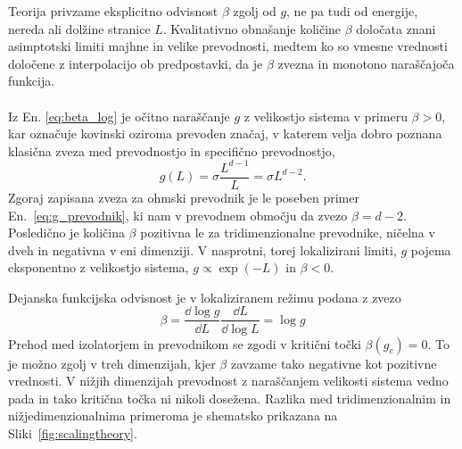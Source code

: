 Teorija privzame eksplicitno odvisnost $\beta$ zgolj od $g$, ne pa tudi od energije, nereda ali dolžine stranice $L$. Kvalitativno obnašanje količine $\beta$ določata znani asimptotski limiti majhne in velike prevodnosti, medtem ko so vmesne vrednosti določene z interpolacijo ob predpostavki, da je $\beta$ zvezna in monotono naraščajoča funkcija. \\\\
Iz En. \eqref{eq:beta_log} je očitno naraščanje $g$ z velikostjo sistema v primeru $\beta>0$, kar označuje kovinski oziroma prevoden značaj, v katerem velja dobro poznana klasična zveza med prevodnostjo in specifično prevodnostjo,
\begin{equation}\label{eq:g_prevodnik}
g(L)=\sigma\frac{L^{d-1}}{L}=\sigma L^{d-2}.
\end{equation}
Zgoraj zapisana zveza za ohmski prevodnik je le poseben primer En.~\eqref{eq:g_prevodnik}, ki nam v prevodnem območju da zvezo $\beta=d-2$. Posledično je količina $\beta$ pozitivna le za tridimenzionalne prevodnike, ničelna v dveh in negativna v eni dimenziji. V nasprotni, torej lokalizirani limiti, $g$ pojema eksponentno z velikostjo sistema, $g\propto \exp(-L)$ in $\beta<0$. \\
\noindent
\begin{minipage}[t]{0.44\textwidth}
Dejanska funkcijska odvisnost je v lokaliziranem režimu podana z zvezo 
\begin{equation}
\beta=\frac{\dd \log g}{\dd L}\frac{\dd L}{\dd \log L}=\log g
\end{equation}
 Prehod med izolatorjem in prevodnikom se zgodi v kritični točki $\beta(g_c)=0$. To je možno zgolj v treh dimenzijah, kjer $\beta$ zavzame tako negativne kot pozitivne vrednosti. V nižjih dimenzijah prevodnost z naraščanjem velikosti sistema vedno pada in tako kritična točka ni nikoli dosežena. Razlika med tridimenzionalnim in nižjedimenzionalnima primeroma je shematsko prikazana na Sliki~\ref{fig:scalingtheory}.
\end{minipage}\hfill
